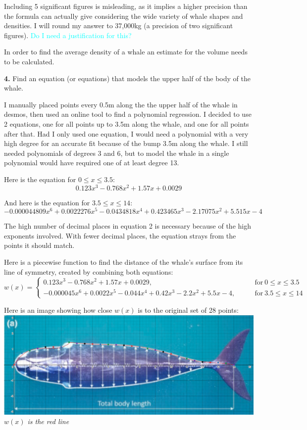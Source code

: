 \documentclass[fleqn]{article}
\newcommand\ask[1]{\textcolor{cyan}{#1}}
\begin{document}
  Including 5 significant figures is misleading, as it implies a higher precision than the formula can actually give considering the wide variety of whale shapes and densities. I will round my answer to 37,000kg (a precision of two significant figures). \ask{Do I need a justification for this?}

In order to find the average density of a whale an estimate for the volume needs to be calculated.

\textbf{4.}	Find an equation (or equations) that models the upper half of the body of the whale.

I manually placed points every 0.5m along the the upper half of the whale in desmos, then used an online tool to find a polynomial regression. I decided to use 2 equations, one for all points up to 3.5m along the whale, and one for all points after that. Had I only used one equation, I would need a polynomial with a very high degree for an accurate fit because of the bump 3.5m along the whale. I still needed polynomials of degrees 3 and 6, but to model the whale in a single polynomial would have required one of at least degree 13. {\color{red}{Appendix with explanation}}

Here is the equation for $0 \leq x \leq 3.5$:
\begin{equation}
  0.123x^3 - 0.768x^2 + 1.57x + 0.0029
\end{equation}

And here is the equation for $3.5 \leq x \leq 14$:
\begin{equation}
  -0.000044809x^6 + 0.0022276x^5 - 0.0434818x^4 + 0.423465x^3 - 2.17075x^2 + 5.515x - 4
\end{equation}

The high number of decimal places in equation 2 is necessary because of the high exponents involved. With fewer decimal places, the equation strays from the points it should match.

Here is a piecewise function to find the distance of the whale's surface from its line of symmetry, created by combining both equations:
\[
w(x)=
\begin{cases}
  0.123x^3 - 0.768x^2 + 1.57x + 0.0029, & \qquad \text{for} \  0 \leq x \leq 3.5 \\
  -0.000045x^6 + 0.0022x^5 - 0.044x^4 + 0.42x^3 - 2.2x^2 + 5.5x - 4, & \qquad \text{for} \  3.5 \leq x \leq 14
\end{cases}
\]

\vbox{
  Here is an image showing how close $w(x)$ is to the original set of 28 points: \\
  \includegraphics[scale=0.3]{desmos-with-piecewise.png} \\
  \textit{\small$w(x)$ is the red line}
}
\end{document}

